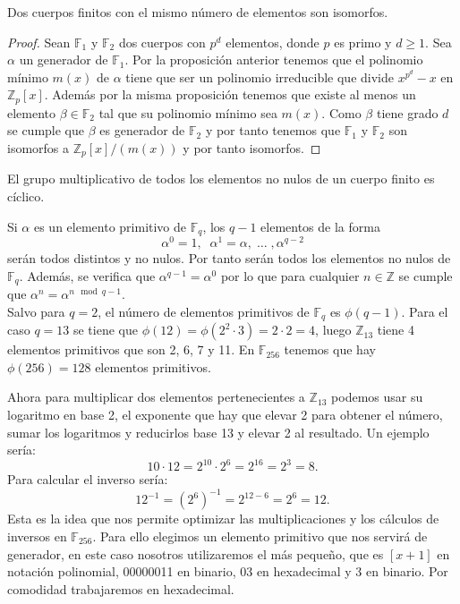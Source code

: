 \begin{teorema}
	Dos cuerpos finitos con el mismo número de elementos son isomorfos.
\end{teorema}
\begin{proof}
		Sean $\mathbb{F}_1$ y $\mathbb{F}_2$ dos cuerpos con $p^d$ elementos, donde $p$ es primo y $d\geq 1$. Sea $\alpha$ un generador de $\mathbb{F}_1$. Por la proposición anterior tenemos que el polinomio mínimo $m(x)$ de $\alpha$ tiene que ser un polinomio irreducible que divide $x^{p^d}-x$ en $\mathbb{Z}_p[x]$. Además por la misma proposición tenemos que existe al menos un elemento $\beta \in \mathbb{F}_2$ tal que su polinomio mínimo sea $m(x)$. Como $\beta$ tiene grado $d$ se cumple que $\beta$ es generador de $\mathbb{F}_2$ y por tanto tenemos que $\mathbb{F}_1$ y $\mathbb{F}_2$ son isomorfos a $\mathbb{Z}_p[x]/(m(x))$ y por tanto isomorfos.
\end{proof}

\begin{corolario}
		El grupo multiplicativo de todos los elementos no nulos de un cuerpo finito es cíclico.
\end{corolario}

Si $\alpha$ es un elemento primitivo de $\mathbb{F}_q$, los $q-1$ elementos de la forma\\
$$
	\alpha^0=1,\;\; \alpha^1=\alpha,\;\dots\; ,\alpha^{q-2}
$$
serán todos distintos y no nulos. Por tanto serán todos los elementos no nulos de $\mathbb{F}_q$. Además, se verifica que $\alpha^{q-1}=\alpha^0$ por lo que para cualquier $n \in \mathbb{Z}$ se cumple que $\alpha^n=\alpha^{n\mod q-1}$.\\

Salvo para $q=2$, el número de elementos primitivos de $\mathbb{F}_q$ es $\phi(q-1)$. Para el caso $q=13$ se tiene que $\phi(12)=\phi(2^2\cdot 3)=2\cdot2=4$, luego $\mathbb{Z}_{13}$ tiene 4 elementos primitivos que son 2, 6, 7 y 11. En $\mathbb{F}_{256}$ tenemos que hay $\phi(256)=128$ elementos primitivos.

Ahora para multiplicar dos elementos pertenecientes a $\mathbb{Z}_{13}$ podemos usar su logaritmo en base 2, el exponente que hay que elevar 2 para obtener el número, sumar los logaritmos y reducirlos base 13 y elevar 2 al resultado. Un ejemplo sería:
$$
	10\cdot12=2^{10}\cdot2^{6}=2^{16}=2^3=8.
$$
Para calcular el inverso sería:
$$
	12^{-1}=(2^6)^{-1}=2^{12-6}=2^6=12.
$$
Esta es la idea que nos permite optimizar las multiplicaciones y los cálculos de inversos en $\mathbb{F}_{256}$. Para ello elegimos un elemento primitivo que nos servirá de generador, en este caso nosotros utilizaremos el más pequeño, que es $[x+1]$ en notación polinomial, 00000011 en binario, 03 en hexadecimal y 3 en binario. Por comodidad trabajaremos en hexadecimal. 

